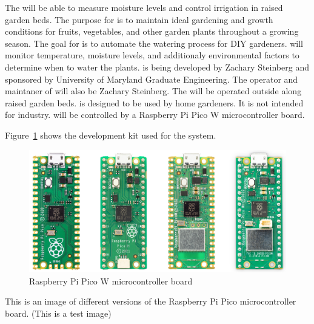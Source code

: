 The \ThisSystem will be able to measure moisture levels and control irrigation in raised garden beds.
The purpose for \ThisSys is to maintain ideal gardening and growth conditions for fruits, vegetables, and other garden plants throughout a growing season.
The goal for \ThisSys is to automate the watering process for DIY gardeners. \ThisSys will monitor temperature, moisture levels, and additionaly environmental factors to determine when to water the plants. 
\ThisSystem is being developed by Zachary Steinberg and sponsored by University of Maryland Graduate Engineering. 
The operator and maintaner of \ThisSys will also be Zachary Steinberg. The \ThisSys will be operated outside along raised garden beds. 
\ThisSys is designed to be used by home gardeners. It is not intended for industry. \ThisSys will be controlled by a Raspberry Pi Pico W microcontroller board.

Figure~\ref{fig:SystemOverview} shows the development kit used for the \ThisSys system. 
\begin{figure}[htbp]
	\centering
		\includegraphics[width=6in]{images/pico_family.jpg}
		\caption{Raspberry Pi Pico W microcontroller board}
	\label{fig:SystemOverview}
\end{figure}
This is an image of different versions of the Raspberry Pi Pico microcontroller board.
(This is a test image)







